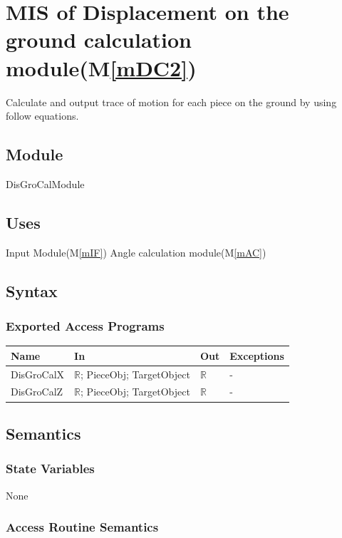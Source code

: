 \documentclass[12pt, titlepage]{article}
\newcommand{\mref}[1]{M\ref{#1}}
\begin{document}
\section{MIS of Displacement on the ground calculation module(\mref{mDC2})}
Calculate and output trace of motion for each piece on the ground by using follow equations.
\subsection{Module}

DisGroCalModule

\subsection{Uses}

Input Module(\mref{mIF})
Angle calculation module(\mref{mAC})

\subsection{Syntax}

\subsubsection{Exported Access Programs}

\begin{center}
	\begin{tabular}{p{2cm} p{4cm} p{4cm} p{2cm}}
		\hline
		\textbf{Name} & \textbf{In} & \textbf{Out} & \textbf{Exceptions} \\
		\hline
		DisGroCalX & $\mathbb{R}$; PieceObj; TargetObject & $\mathbb{R}$ & - \\
		DisGroCalZ & $\mathbb{R}$; PieceObj; TargetObject & $\mathbb{R}$ & - \\
		\hline
	\end{tabular}
\end{center}

\subsection{Semantics}

\subsubsection{State Variables}

None

\subsubsection{Access Routine Semantics}
\end{document}
